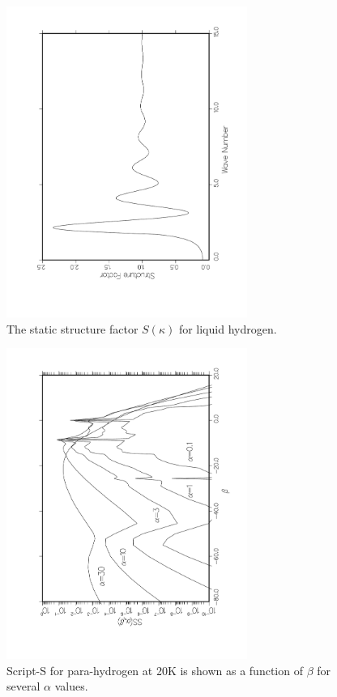 \begin{figure}[tp]\centering
\includegraphics[keepaspectratio, height=4.0in, angle=270]{figs/le10skack}
\caption[The static structure factor, $S(\kappa)$, for liquid hydrogen]{The
 static structure factor $S(\kappa)$ for liquid hydrogen.}
\label{skh}
\end{figure}

\begin{figure}[bp]\centering
\includegraphics[keepaspectratio, height=4.0in, angle=270]{figs/le11aack}
\caption[script-S vs beta for para-hydrogen]{Script-S for para-hydrogen
 at 20K is shown as a function of $\beta$ for several $\alpha$ values.}
\label{fig11a}
\end{figure}

